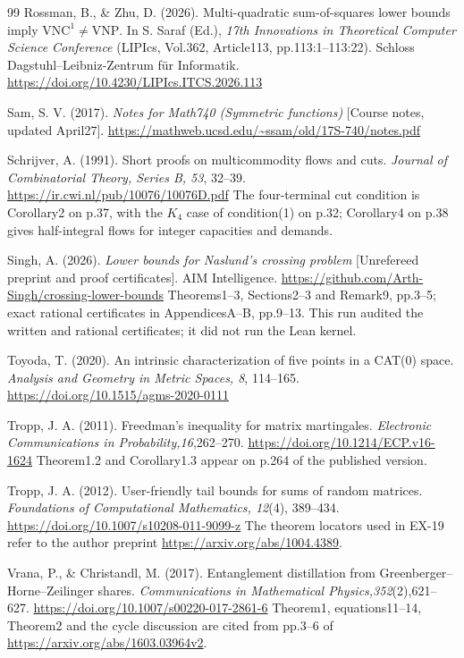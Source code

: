 \begin{thebibliography}{99}
Rossman, B., \& Zhu, D. (2026).
Multi-quadratic sum-of-squares lower bounds imply $\mathrm{VNC}^1\ne\mathrm{VNP}$.
In S. Saraf (Ed.), \emph{17th Innovations in Theoretical Computer
Science Conference} (LIPIcs, Vol.362, Article113, pp.113:1--113:22).
Schloss Dagstuhl--Leibniz-Zentrum f\"ur Informatik.
\url{https://doi.org/10.4230/LIPIcs.ITCS.2026.113}

Sam, S. V. (2017). \emph{Notes for Math740 (Symmetric functions)}
[Course notes, updated April27].
\url{https://mathweb.ucsd.edu/~ssam/old/17S-740/notes.pdf}


Schrijver, A. (1991). Short proofs on multicommodity flows and cuts.
\emph{Journal of Combinatorial Theory, Series B, 53}, 32--39.
\url{https://ir.cwi.nl/pub/10076/10076D.pdf}
The four-terminal cut condition is Corollary2 on p.37, with the
$K_4$ case of condition(1) on p.32; Corollary4 on p.38 gives
half-integral flows for integer capacities and demands.

Singh, A. (2026). \emph{Lower bounds for Naslund's crossing problem}
[Unrefereed preprint and proof certificates]. AIM Intelligence.
\url{https://github.com/Arth-Singh/crossing-lower-bounds}
Theorems1--3, Sections2--3 and Remark9, pp.3--5; exact rational
certificates in AppendicesA--B, pp.9--13. This run audited the
written and rational certificates; it did not run the Lean kernel.

Toyoda, T. (2020). An intrinsic characterization of five points
in a CAT(0) space. \emph{Analysis and Geometry in Metric Spaces, 8},
114--165. \url{https://doi.org/10.1515/agms-2020-0111}

Tropp, J. A. (2011). Freedman's inequality for matrix martingales.
\emph{Electronic Communications in Probability,16},262--270.
\url{https://doi.org/10.1214/ECP.v16-1624}
Theorem1.2 and Corollary1.3 appear on p.264 of the published version.

Tropp, J. A. (2012). User-friendly tail bounds for sums of random
matrices. \emph{Foundations of Computational Mathematics, 12}(4),
389--434. \url{https://doi.org/10.1007/s10208-011-9099-z}
The theorem locators used in EX-19 refer to the author preprint
\url{https://arxiv.org/abs/1004.4389}.

Vrana, P., \& Christandl, M. (2017). Entanglement distillation
from Greenberger--Horne--Zeilinger shares.
\emph{Communications in Mathematical Physics,352}(2),621--627.
\url{https://doi.org/10.1007/s00220-017-2861-6}
Theorem1, equations11--14, Theorem2 and the cycle discussion are cited
from pp.3--6 of \url{https://arxiv.org/abs/1603.03964v2}.


\end{thebibliography}
